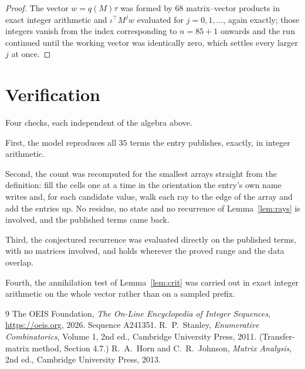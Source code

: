 \documentclass[11pt,a4paper]{article}
\theoremstyle{plain}
\theoremstyle{definition}
\begin{document}
\begin{proof}
The vector $w=q(M)\tau$ was formed by $68$ matrix--vector products in exact integer
arithmetic and $\iota^{\!\top}M^{j}w$ evaluated for $j=0,1,\dots$, again exactly; those
integers vanish from the index corresponding to $n=85+1$ onwards and the run continued
until the working vector was identically zero, which settles every larger $j$ at once.
\end{proof}

\section{Verification}

Four checks, each independent of the algebra above.

First, the model reproduces all $35$ terms the entry publishes, exactly, in integer
arithmetic.

Second, the count was recomputed for the smallest arrays straight from the definition: fill the
cells one at a time in the orientation the entry's own name writes and, for each candidate
value, walk each ray to the edge of the array and add the entries up. No residue, no state and
no recurrence of Lemma~\ref{lem:rays} is involved, and the published terms came back.

Third, the conjectured recurrence was evaluated directly on the published terms, with no
matrices involved, and holds wherever the proved range and the data overlap.

Fourth, the annihilation test of Lemma~\ref{lem:crit} was carried out in exact integer
arithmetic on the whole vector rather than on a sampled prefix.

\begin{thebibliography}{9}
 The OEIS Foundation, \emph{The On-Line Encyclopedia of Integer
Sequences}, \url{https://oeis.org}, 2026. Sequence A241351.
 R.~P.~Stanley, \emph{Enumerative Combinatorics}, Volume 1, 2nd ed.,
Cambridge University Press, 2011. (Transfer-matrix method, Section 4.7.)
 R.~A.~Horn and C.~R.~Johnson, \emph{Matrix Analysis}, 2nd ed., Cambridge
University Press, 2013.
\end{thebibliography}
\end{document}
